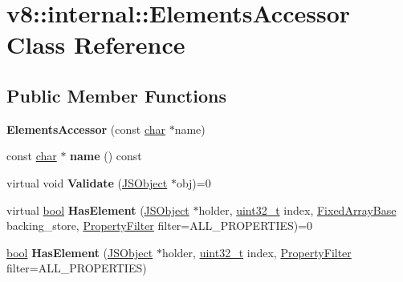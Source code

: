 \hypertarget{classv8_1_1internal_1_1ElementsAccessor}{}\section{v8\+:\+:internal\+:\+:Elements\+Accessor Class Reference}
\label{classv8_1_1internal_1_1ElementsAccessor}
\subsection*{Public Member Functions}
\begin{DoxyCompactItemize}
\item 
\mbox{\label{classv8_1_1internal_1_1ElementsAccessor_afd173d3eec2fdc84c886bce26c4066ab}} 
{\bfseries Elements\+Accessor} (const \mbox{\hyperlink{classchar}{char}} $\ast$name)
\item 
\mbox{\label{classv8_1_1internal_1_1ElementsAccessor_a905faf3fc1ae4bcf4d017105cd5cb081}} 
const \mbox{\hyperlink{classchar}{char}} $\ast$ {\bfseries name} () const
\item 
\mbox{\label{classv8_1_1internal_1_1ElementsAccessor_acdf95894974420d89a7930c2fdce6c3c}} 
virtual void {\bfseries Validate} (\mbox{\hyperlink{classv8_1_1internal_1_1JSObject}{J\+S\+Object}} $\ast$obj)=0
\item 
\mbox{\label{classv8_1_1internal_1_1ElementsAccessor_aef944dd6039214ab81dfc3b716f952d3}} 
virtual \mbox{\hyperlink{classbool}{bool}} {\bfseries Has\+Element} (\mbox{\hyperlink{classv8_1_1internal_1_1JSObject}{J\+S\+Object}} $\ast$holder, \mbox{\hyperlink{classuint32__t}{uint32\+\_\+t}} index, \mbox{\hyperlink{classv8_1_1internal_1_1FixedArrayBase}{Fixed\+Array\+Base}} backing\+\_\+store, \mbox{\hyperlink{namespacev8_afbf02b6b1152a3e25d7bde90798209ac}{Property\+Filter}} filter=A\+L\+L\+\_\+\+P\+R\+O\+P\+E\+R\+T\+I\+ES)=0
\item 
\mbox{\label{classv8_1_1internal_1_1ElementsAccessor_a777bd32b916954a99d1d5db0f1769e75}} 
\mbox{\hyperlink{classbool}{bool}} {\bfseries Has\+Element} (\mbox{\hyperlink{classv8_1_1internal_1_1JSObject}{J\+S\+Object}} $\ast$holder, \mbox{\hyperlink{classuint32__t}{uint32\+\_\+t}} index, \mbox{\hyperlink{namespacev8_afbf02b6b1152a3e25d7bde90798209ac}{Property\+Filter}} filter=A\+L\+L\+\_\+\+P\+R\+O\+P\+E\+R\+T\+I\+ES)

\end{DoxyCompactItemize}
